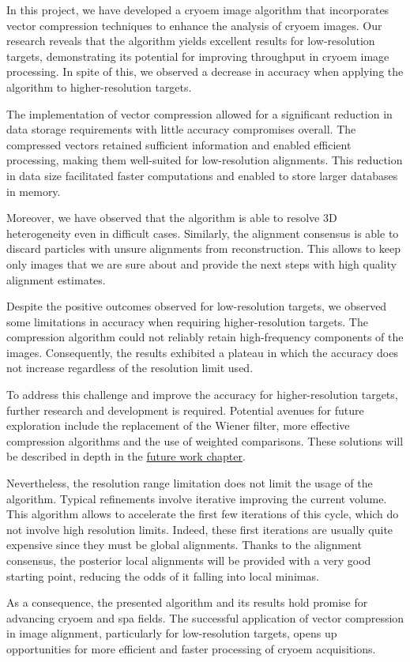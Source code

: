 \documentclass[../main.tex]{subfiles}
\begin{document}
In this project, we have developed a \gls{cryoem} image algorithm that incorporates vector compression techniques to enhance the analysis of  \gls{cryoem} images. Our research reveals that the algorithm yields excellent results for low-resolution targets, demonstrating its potential for improving throughput in \gls{cryoem} image processing. In spite of this, we observed a decrease in accuracy when applying the algorithm to higher-resolution targets.

The implementation of vector compression allowed for a significant reduction in data storage requirements with little accuracy compromises overall. The compressed vectors retained sufficient information and enabled efficient processing, making them well-suited for low-resolution alignments. This reduction in data size facilitated faster computations and enabled to store larger databases in memory.

Moreover, we have observed that the algorithm is able to resolve 3D heterogeneity even in difficult cases. Similarly, the alignment consensus is able to discard particles with unsure alignments from reconstruction. This allows to keep only images that we are sure about and provide the next steps with high quality alignment estimates.

Despite the positive outcomes observed for low-resolution targets, we observed some limitations in accuracy when requiring higher-resolution targets. The compression algorithm could not reliably retain high-frequency components of the images. Consequently, the results exhibited a plateau in which the accuracy does not increase regardless of the resolution limit used.

To address this challenge and improve the accuracy for higher-resolution targets, further research and development is required. Potential avenues for future exploration include the replacement of the Wiener filter, more effective compression algorithms and the use of weighted comparisons. These solutions will be described in depth in the \hyperlink{chap:future}{future work chapter}.

Nevertheless, the resolution range limitation does not limit the usage of the algorithm. Typical refinements involve iterative improving the current volume. This algorithm allows to accelerate the first few iterations of this cycle, which do not involve high resolution limits. Indeed, these first iterations are usually quite expensive since they must be global alignments. Thanks to the alignment consensus, the posterior local alignments will be provided with a very good starting point, reducing the odds of it falling into local minimas.

As a consequence, the presented algorithm and its results hold promise for advancing \gls{cryoem} and \gls{spa} fields. The successful application of vector compression in image alignment, particularly for low-resolution targets, opens up opportunities for more efficient and faster processing of \gls{cryoem} acquisitions.
\end{document}
